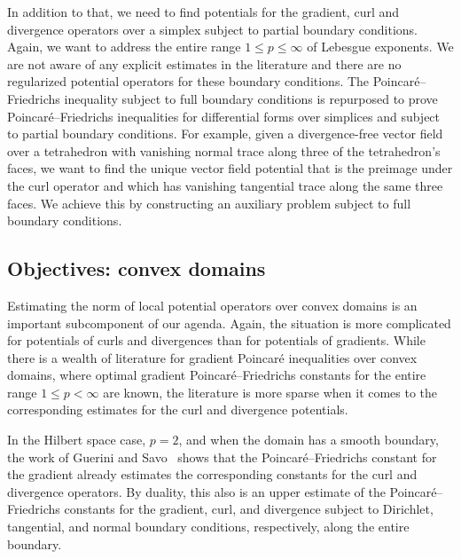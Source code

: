 \documentclass[10pt,a4paper]{article}
\begin{document}
In addition to that, we need to find potentials for the gradient, curl and divergence operators over a simplex subject to partial boundary conditions. 
Again, we want to address the entire range $1 \leq p \leq \infty$ of Lebesgue exponents. 
We are not aware of any explicit estimates in the literature and there are no regularized potential operators for these boundary conditions. 
The Poincar\'e--Friedrichs inequality subject to full boundary conditions is repurposed to prove Poincar\'e--Friedrichs inequalities for differential forms over simplices and subject to partial boundary conditions. 
For example, given a divergence-free vector field over a tetrahedron with vanishing normal trace along three of the tetrahedron's faces, 
we want to find the unique vector field potential that is the preimage under the curl operator and which has vanishing tangential trace along the same three faces. 
We achieve this by constructing an auxiliary problem subject to full boundary conditions.
\\





\subsection{Objectives: convex domains}

Estimating the norm of local potential operators over convex domains is an important subcomponent of our agenda. 
Again, the situation is more complicated for potentials of curls and divergences than for potentials of gradients.
While there is a wealth of literature for gradient Poincar\'e inequalities over convex domains, where optimal gradient Poincar\'e--Friedrichs constants for the entire range $1 \leq p < \infty$ are known,
the literature is more sparse when it comes to the corresponding estimates for the curl and divergence potentials.

In the Hilbert space case, $p=2$, and when the domain has a smooth boundary, the work of Guerini and Savo~\cite{guerini2004eigenvalue} shows that the Poincar\'e--Friedrichs constant for the gradient already estimates the corresponding constants for the curl and divergence operators. By duality, this also is an upper estimate of the Poincar\'e--Friedrichs constants for the gradient, curl, and divergence subject to Dirichlet, tangential, and normal boundary conditions, respectively, along the entire boundary. 
\end{document}
